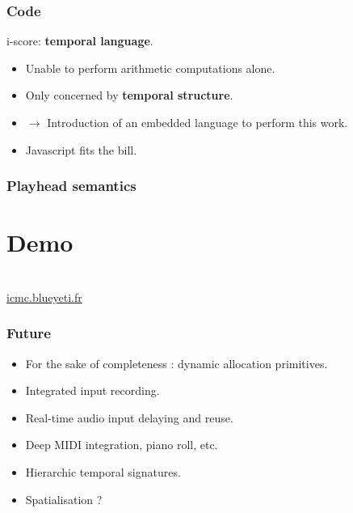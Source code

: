 \documentclass{beamer}
\begin{document}
\begin{frame}
    \frametitle{Code}
    \Large
    i-score: \textbf{temporal language}. 
    \begin{itemize}
    \item Unable to perform arithmetic computations alone. 
    \item Only concerned by \textbf{temporal structure}.
    \item $\rightarrow$ Introduction of an embedded language to perform this work.
    \item Javascript fits the bill.
    \end{itemize}
    
    \Large
\end{frame}



\begin{frame}
    \frametitle{Playhead semantics}
    \Large
\end{frame}

\section{Demo}

\begin{frame}
    \Huge
    ~\\\vspace{1cm}
    \url{icmc.blueyeti.fr}
\end{frame}

\begin{frame}
	\frametitle{Future} 
	\Large
	\begin{itemize}
        \item<1> For the sake of completeness : dynamic allocation primitives.
		\item<1> Integrated input recording.
		\item<2> Real-time audio input delaying and reuse.
		\item<3> Deep MIDI integration, piano roll, etc.
		\item<4> Hierarchic temporal signatures.
        \item<5> Spatialisation ?
		
	\end{itemize}
\end{frame}    


\begin{frame}[allowframebreaks]%
    
    
    
    {\footnotesize
        \nocite{*}
        
        
    }
\end{frame}
\end{document}
